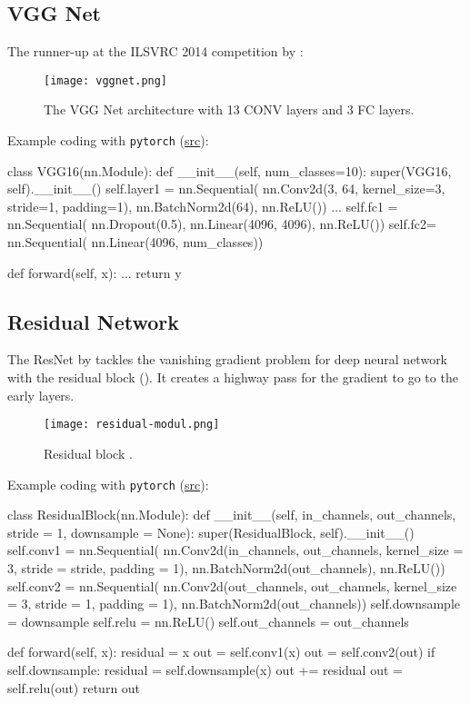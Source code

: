 \subsection{VGG Net}
The runner-up at the ILSVRC 2014 competition by :

\begin{figure}[hbt!]
	\centering
	\texttt{[image: vggnet.png]}
	\caption{The VGG Net architecture with 13 \ac{CONV} layers and 3 \ac{FC} layers. \cite{simonyan2014very}}
\end{figure}

Example coding with \texttt{pytorch} (\href{https://blog.paperspace.com/vgg-from-scratch-pytorch/}{src}):
\begin{python}
class VGG16(nn.Module):
	def __init__(self, num_classes=10):
		super(VGG16, self).__init__()
		self.layer1 = nn.Sequential(
			nn.Conv2d(3, 64, kernel_size=3, stride=1, padding=1),
			nn.BatchNorm2d(64),
			nn.ReLU())
		...
		self.fc1 = nn.Sequential(
			nn.Dropout(0.5),
			nn.Linear(4096, 4096),
			nn.ReLU())
		self.fc2= nn.Sequential(
			nn.Linear(4096, num_classes))

	def forward(self, x):
		...
		return y
\end{python}

\subsection{Residual Network}
The \ac{ResNet} by  tackles the vanishing gradient problem for deep neural network with the residual block (). It creates a highway pass for the gradient to go to the early layers.
\begin{figure}[hbt!]
	\centering
	\texttt{[image: residual-modul.png]}
	\caption{Residual block \cite{he2016deep}.}
	\label{fig:residual-modul}
\end{figure}

Example coding with \texttt{pytorch} (\href{https://blog.paperspace.com/writing-resnet-from-scratch-in-pytorch/}{src}):
\begin{python}
class ResidualBlock(nn.Module):
	def __init__(self, in_channels, out_channels,
			stride = 1, downsample = None):
		super(ResidualBlock, self).__init__()
		self.conv1 = nn.Sequential(
			nn.Conv2d(in_channels, out_channels, kernel_size = 3,
				stride = stride, padding = 1),
			nn.BatchNorm2d(out_channels),
			nn.ReLU())
		self.conv2 = nn.Sequential(
			nn.Conv2d(out_channels, out_channels, kernel_size = 3,
				stride = 1, padding = 1),
			nn.BatchNorm2d(out_channels))
		self.downsample = downsample
		self.relu = nn.ReLU()
		self.out_channels = out_channels
	
	def forward(self, x):
		residual = x
		out = self.conv1(x)
		out = self.conv2(out)
		if self.downsample:
			residual = self.downsample(x)
		out += residual
		out = self.relu(out)
		return out
\end{python}

